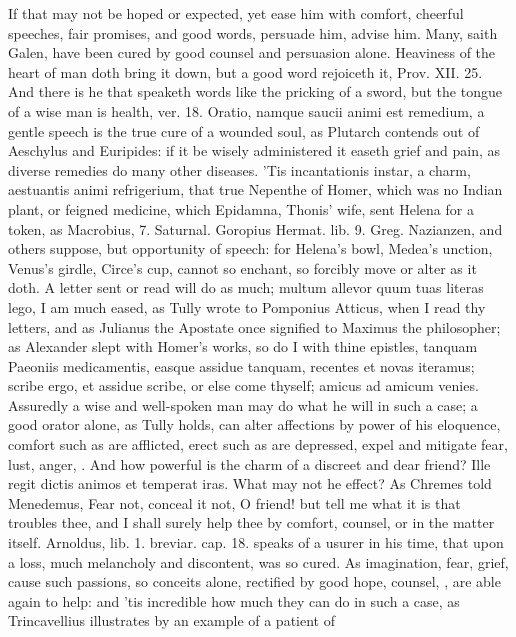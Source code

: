 {If that may not be hoped or expected, yet ease him with comfort,
cheerful speeches, fair promises, and good words, persuade him, advise
him. Many, saith Galen, have been cured by good counsel and
persuasion alone. Heaviness of the heart of man doth bring it down, but
a good word rejoiceth it, Prov. XII. 25. And there is he that speaketh
words like the pricking of a sword, but the tongue of a wise man is
health, ver. 18. Oratio, namque saucii animi est remedium, a gentle
speech is the true cure of a wounded soul, as Plutarch contends
out of Aeschylus and Euripides: if it be wisely administered it easeth
grief and pain, as diverse remedies do many other diseases. 'Tis
incantationis instar, a charm, aestuantis animi refrigerium, that true
Nepenthe of Homer, which was no Indian plant, or feigned medicine,
which Epidamna, Thonis' wife, sent Helena for a token, as Macrobius, 7.
Saturnal. Goropius Hermat. lib. 9. Greg. Nazianzen, and others suppose,
but opportunity of speech: for Helena's bowl, Medea's unction, Venus's
girdle, Circe's cup, cannot so enchant, so forcibly move or alter as it
doth. A letter sent or read will do as much; multum allevor quum tuas
literas lego, I am much eased, as Tully wrote to Pomponius
Atticus, when I read thy letters, and as Julianus the Apostate once
signified to Maximus the philosopher; as Alexander slept with Homer's
works, so do I with thine epistles, tanquam Paeoniis medicamentis,
easque assidue tanquam, recentes et novas iteramus; scribe ergo, et
assidue scribe, or else come thyself; amicus ad amicum venies.
Assuredly a wise and well-spoken man may do what he will in such a
case; a good orator alone, as Tully holds, can alter affections
by power of his eloquence, comfort such as are afflicted, erect such as
are depressed, expel and mitigate fear, lust, anger, \etc{}. And how
powerful is the charm of a discreet and dear friend? Ille regit dictis
animos et temperat iras. What may not he effect? As Chremes told
Menedemus, Fear not, conceal it not, O friend! but tell me what it is
that troubles thee, and I shall surely help thee by comfort, counsel,
or in the matter itself.  Arnoldus, lib. 1. breviar. cap. 18.
speaks of a usurer in his time, that upon a loss, much melancholy and
discontent, was so cured. As imagination, fear, grief, cause such
passions, so conceits alone, rectified by good hope, counsel, \etc{}, are
able again to help: and 'tis incredible how much they can do in such a
case, as Trincavellius illustrates by an example of a patient of
}
